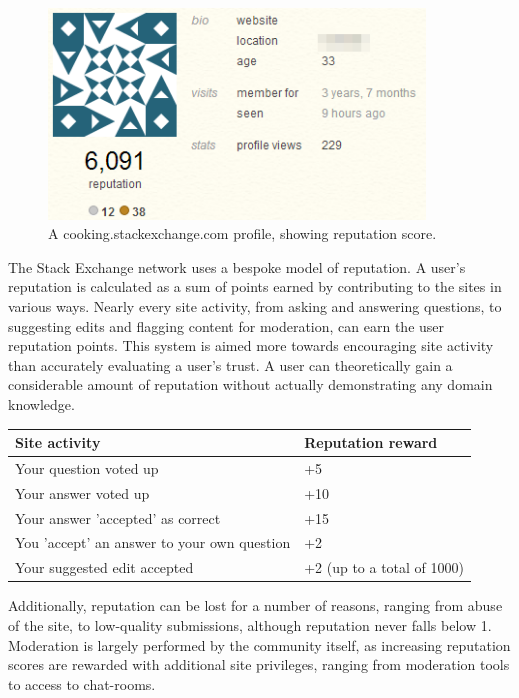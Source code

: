 \documentclass[]{final_report}
\begin{document}
\begin{figure}[ht!]
\centering
\includegraphics[width=100mm]{serep.png}
\caption{A cooking.stackexchange.com profile, showing reputation score.}
\end{figure}


The Stack Exchange network uses a bespoke model of reputation. A user's reputation is calculated as a sum of points earned by contributing to the sites in various ways. Nearly every site activity, from asking and answering questions, to suggesting edits and flagging content for moderation, can earn the user reputation points. This system is aimed more towards encouraging site activity than accurately evaluating a user's trust. A user can theoretically gain a considerable amount of reputation without actually demonstrating any domain knowledge.

\begin{minipage}{\linewidth}
\centering
\begin{tabular}{|l|l|}
\hline \textbf{Site activity} & \textbf{Reputation reward} \\ 
\hline Your question voted up & +5 \\ 
\hline Your answer voted up & +10 \\ 
\hline Your answer 'accepted' as correct & +15 \\ 
\hline You 'accept' an answer to your own question & +2 \\ 
\hline Your suggested edit accepted & +2 (up to a total of 1000) \\ 
\hline 
\end{tabular}\par
{} \label{tab:title}
\end{minipage}


Additionally, reputation can be lost for a number of reasons, ranging from abuse of the site, to low-quality submissions, although reputation never falls below 1. Moderation is largely performed by the community itself, as increasing reputation scores are rewarded with additional site privileges, ranging from moderation tools to access to chat-rooms.
\end{document}
